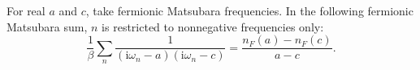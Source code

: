 \documentclass{article}
\begin{document}
For real $a$ and $c$, take fermionic Matsubara frequencies.  In the following
fermionic Matsubara sum, $n$ is restricted to nonnegative frequencies only:
\begin{equation}
\frac{1}{\beta}\sum_n \frac{1}{(\mathrm{i}\omega_n-a)(\mathrm{i}\omega_n-c)}
= \frac{n_F(a)-n_F(c)}{a-c} .
\label{eq:positive-frequency-sum}
\end{equation}
\end{document}
